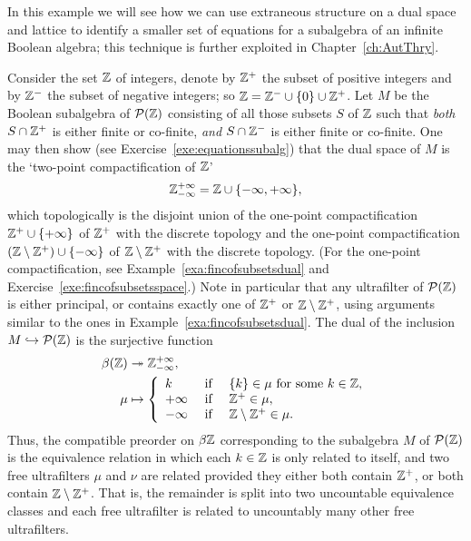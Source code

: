 \begin{example}\label{exa:equationssubalg}
In this example we will see how we can use extraneous structure on a dual space and lattice to identify a smaller set of equations for a subalgebra of an infinite Boolean algebra; this technique is further exploited in Chapter~\ref{ch:AutThry}. %

Consider the set $\mathbb{Z}$ of integers, denote by $\mathbb{Z}^+$ the subset of positive integers and by $\mathbb{Z}^-$ the subset of negative integers; so $\mathbb{Z} = \mathbb{Z}^- \cup \{0\} \cup \mathbb{Z}^+$. Let $M$ be the Boolean subalgebra of $\mathcal{P}(\mathbb{Z})$ consisting of all those subsets $S$ of $\mathbb{Z}$ such that \emph{both} $S\cap\mathbb{Z}^+$ is either finite or co-finite, \emph{and} $S\cap\mathbb{Z}^-$ is either finite or co-finite. One may then show (see Exercise~\ref{exe:equationssubalg}) that the dual space of $M$ is the `two-point compactification of $\mathbb{Z}$' 
\[
\mathbb{Z}_{-\infty}^{+\infty}=\mathbb{Z}\cup\{-\infty,+\infty\},
\]
 which topologically is the disjoint union of the one-point compactification $\mathbb{Z}^+\cup\{+\infty\}$ of $\mathbb{Z}^+$ with the discrete topology and the one-point compactification $(\mathbb{Z}\setminus\mathbb{Z}^+)\cup\{-\infty\}$ of $\mathbb{Z} \setminus \mathbb{Z}^+$ with the discrete topology. (For the one-point compactification, see Example~\ref{exa:fincofsubsetsdual} and Exercise~\ref{exe:fincofsubsetsspace}.) Note in particular that any ultrafilter of $\mathcal{P}(\mathbb{Z})$ is either principal, or contains exactly one of $\mathbb{Z}^+$ or $\mathbb{Z} \setminus \mathbb{Z}^+$, using arguments similar to the ones in Example~\ref{exa:fincofsubsetsdual}. The dual of the inclusion $M\hookrightarrow\mathcal{P}(\mathbb{Z})$ is the surjective function
\begin{align*}
\beta(\bZ)&\onto \bZ_{-\infty}^{+\infty}, \\
\mu&\mapsto\left\{ 
   \begin{array}{lll}
   k & \text{ if } & \{k\}\in\mu \text{ for some } k \in \bZ,\\
   +\infty & \text{ if } & \bZ^+\in\mu,\\%
   -\infty & \text{ if } & \bZ \setminus \bZ^+\in\mu.%
   \end{array}
   \right.
\end{align*}
Thus, the compatible preorder on $\beta\mathbb{Z}$ corresponding to the subalgebra $M$ of $\mathcal{P}(\mathbb{Z})$ is the equivalence relation in which each $k\in \mathbb{Z}$ is only related to itself, and two free ultrafilters $\mu$ and $\nu$ are related provided they either both contain $\mathbb{Z}^+$, or both contain $\mathbb{Z} \setminus \mathbb{Z}^+$. 
That is, the remainder is split into two uncountable equivalence classes and each free ultrafilter is related to uncountably many other free ultrafilters.


\end{example}
